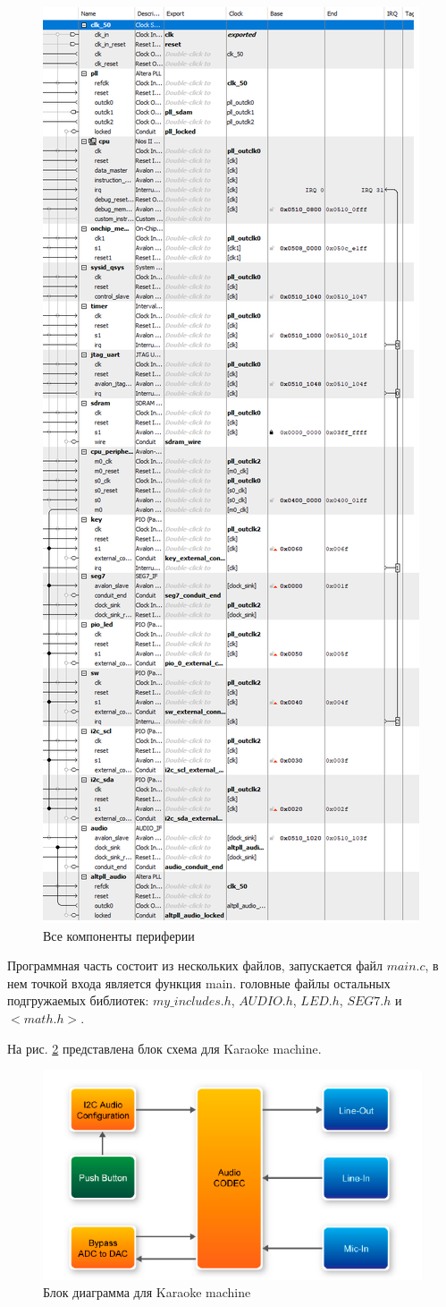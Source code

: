 \documentclass[a4paper,14pt]{article}
\begin{document}
	\begin{figure}[H]
		\centering
		\includegraphics[width=0.55\linewidth]{images/QSYS1}
		\caption{Все компоненты периферии}
		\label{fig:qsys}
	\end{figure}

	Программная часть состоит из нескольких файлов, запускается файл $main.c$, в нем точкой входа является функция main.
	головные файлы остальных подгружаемых библиотек: $my\_includes.h$, $AUDIO.h$, $LED.h$, $SEG7.h$ и $<math.h>$.
	
	На рис. \ref{fig:shemeqsys2} представлена блок схема для Karaoke machine.
	
	\begin{figure}[H]
		\centering
		\includegraphics[width=0.7\linewidth]{images/sheme_qsys_2}
		\caption{Блок диаграмма для Karaoke machine}
		\label{fig:shemeqsys2}
	\end{figure}
	
\end{document}
